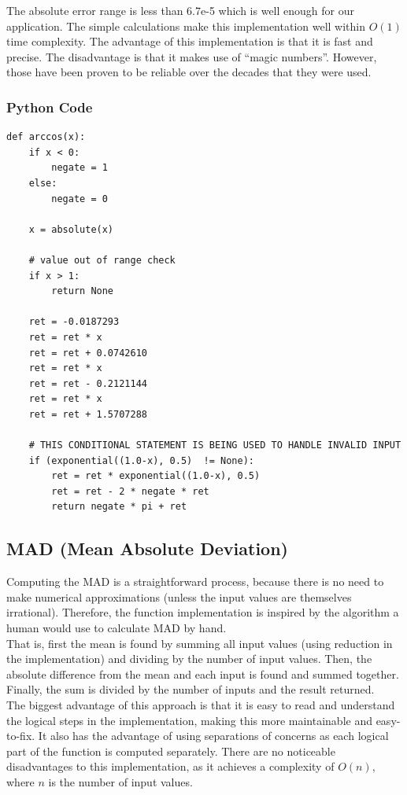 \documentclass[11pt,onside]{report}
\begin{document}
The absolute error range is less than 6.7e-5 which is well enough for our application. The simple calculations make this implementation well within $O(1)$ time complexity. The advantage of this implementation is that it is fast and precise. The disadvantage is that it makes use of “magic numbers”. However, those have been proven to be reliable over the decades that they were used.

\subsubsection{Python Code}
\begin{lstlisting}
def arccos(x):
    if x < 0:
        negate = 1
    else:
        negate = 0

    x = absolute(x)

    # value out of range check
    if x > 1:
        return None

    ret = -0.0187293
    ret = ret * x
    ret = ret + 0.0742610
    ret = ret * x
    ret = ret - 0.2121144
    ret = ret * x
    ret = ret + 1.5707288

    # THIS CONDITIONAL STATEMENT IS BEING USED TO HANDLE INVALID INPUT
    if (exponential((1.0-x), 0.5)  != None):
        ret = ret * exponential((1.0-x), 0.5)
        ret = ret - 2 * negate * ret
        return negate * pi + ret

\end{lstlisting}

\subsection{MAD (Mean Absolute Deviation)}
Computing the MAD is a straightforward process, because there is no need to make numerical approximations (unless the input values are themselves irrational). Therefore, the function implementation is inspired by the algorithm a human would use to calculate MAD by hand. \\

That is, first the mean is found by summing all input values (using reduction in the implementation) and dividing by the number of input values. Then, the absolute difference from the mean and each input is found and summed together. Finally, the sum is divided by the number of inputs and the result returned. \\

The biggest advantage of this approach is that it is easy to read and understand the logical steps in the implementation, making this more maintainable and easy-to-fix. It also has the advantage of using separations of concerns as each logical part of the function is computed separately. There are no noticeable disadvantages to this implementation, as it achieves a complexity of $O(n)$, where $n$ is the number of input values.
\end{document}
